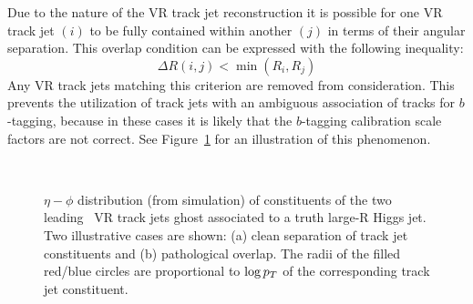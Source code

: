 Due to the nature of the VR track jet reconstruction it is possible for one VR track jet $(i)$ to be fully contained within another $(j)$ in terms of their angular separation.
This overlap condition can be expressed with the following inequality:
\begin{equation}
    \Delta R(i,j) < \min(R_i, R_j)
\end{equation}
Any VR track jets matching this criterion are removed from consideration.
This prevents the utilization of track jets with an ambiguous association of tracks for $b$-tagging, because in these cases it is likely that the $b$-tagging calibration scale factors are not correct.
See Figure~\ref{fig:vr_contain} for an illustration of this phenomenon.

\begin{figure}[htbp!]
    \begin{center}
        \\
    \end{center}
    \caption{ $\eta-\phi$ distribution (from simulation) of constituents of the two leading \pt\ VR track jets ghost associated to a truth large-R Higgs jet.
        Two illustrative cases are shown: (a) clean separation of track jet constituents and (b) pathological overlap.
        The radii of the filled red/blue circles are proportional to $\log{\ensuremath{p_{T}}}$ of the corresponding track jet constituent.
    }
    \label{fig:vr_contain}
\end{figure}


